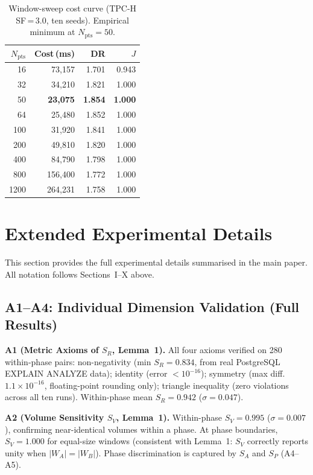 \documentclass[10pt,twocolumn,a4paper]{article}
\newcommand{\SR}{S_{R}}
\newcommand{\SV}{S_{V}}
\newcommand{\SA}{S_{A}}
\newcommand{\SPER}{S_{P}}
\newcommand{\Npts}{N_{\mathrm{pts}}}
\begin{document}
\begin{table}[htbp]\centering\small
\caption{Window-sweep cost curve (TPC-H SF\,=\,3.0, ten seeds).
Empirical minimum at $\Npts\!=\!50$.}\label{tab:supp-optwin-cost}
\begin{tabular}{@{}rrrr@{}}
\toprule
\textbf{$\Npts$} & \textbf{Cost\,(ms)} & \textbf{DR} & \textbf{$J$}\\
\midrule
16   & 73{,}157  & 1.701 & 0.943\\
32   & 34{,}210  & 1.821 & 1.000\\
50   & \textbf{23{,}075} & \textbf{1.854} & \textbf{1.000}\\
64   & 25{,}480  & 1.852 & 1.000\\
100  & 31{,}920  & 1.841 & 1.000\\
200  & 49{,}810  & 1.820 & 1.000\\
400  & 84{,}790  & 1.798 & 1.000\\
800  & 156{,}400 & 1.772 & 1.000\\
1200 & 264{,}231 & 1.758 & 1.000\\
\bottomrule
\end{tabular}
\end{table}

\section{Extended Experimental Details}\label{supp:experiments}

This section provides the full experimental details summarised in the
main paper. All notation follows Sections~I--X above.

\subsection{A1--A4: Individual Dimension Validation (Full Results)}

\textbf{A1 (Metric Axioms of $\SR$, Lemma~1).} All four axioms verified on
280 within-phase pairs: non-negativity (min $\SR\!=\!0.834$, from real
PostgreSQL EXPLAIN ANALYZE data); identity (error $<10^{-16}$); symmetry
(max diff.\ $1.1\times10^{-16}$, floating-point rounding only); triangle
inequality (zero violations across all ten runs). Within-phase mean
$\SR\!=\!0.942$ ($\sigma\!=\!0.047$).

\textbf{A2 (Volume Sensitivity $\SV$, Lemma~1).} Within-phase $\SV\!=\!0.995$
($\sigma\!=\!0.007$), confirming near-identical volumes within a phase.
At phase boundaries, $\SV\!=\!1.000$ for equal-size windows (consistent
with Lemma~1: $\SV$ correctly reports unity when $|W_A|\!=\!|W_B|$). Phase
discrimination is captured by $\SA$ and $\SPER$ (A4--A5).
\end{document}
